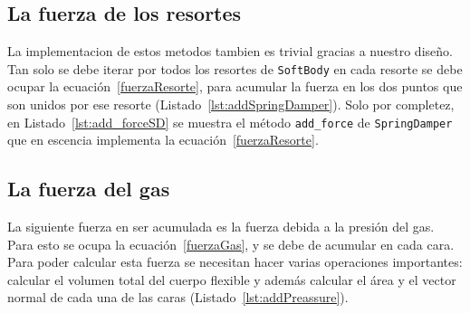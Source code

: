 \subsection{La fuerza de los resortes}

La implementacion de estos metodos tambien es trivial gracias a nuestro diseño.
Tan solo se debe iterar por todos los resortes de \texttt{SoftBody} en cada resorte se debe ocupar la ecuación~\ref{fuerzaResorte}, para acumular la fuerza en los dos puntos que son unidos por ese resorte (Listado~\ref{lst:addSpringDamper}).
Solo por completez, en Listado~\ref{lst:add_forceSD} se muestra el método \texttt{add_force} de \texttt{SpringDamper} que en escencia implementa la ecuación~\ref{fuerzaResorte}.



\subsection{La fuerza del gas}
\label{sec:fuerzaGas}

La siguiente fuerza en ser acumulada es la fuerza debida a la presión del gas. Para esto se ocupa la ecuación~\ref{fuerzaGas}, y se debe de acumular en cada cara.
Para poder calcular esta fuerza se necesitan hacer varias operaciones importantes: calcular el volumen total del cuerpo flexible y además calcular el área y el vector normal de cada una de las caras (Listado~\ref{lst:addPreassure}).


